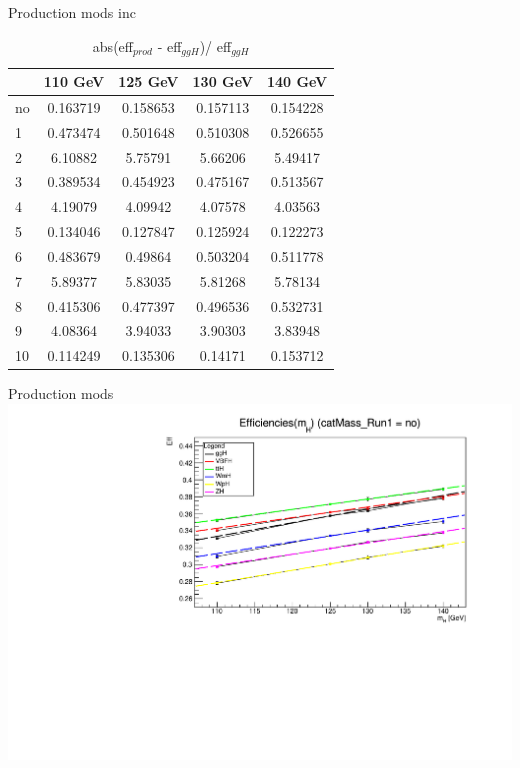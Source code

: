 \documentclass[10pt,UKenglish, leqno, xcolor = dvipsnames]{beamer}
\begin{document}
		\begin{frame}{Production mods inc}
			\vfill
			\centering
			\begin{table}[tbp]
				\centering
				\begin{tabular}{lcccc}
					\toprule[1.5pt]
								& 110 GeV	& 125 GeV	& 130 GeV	& 140 GeV	\\
					\midrule
					no & 0.163719 & 0.158653 & 0.157113 & 0.154228	\\
					1 & 0.473474 & 0.501648 & 0.510308 & 0.526655	\\
					2 & 6.10882 & 5.75791 & 5.66206 & 5.49417		\\
					3 & 0.389534 & 0.454923 & 0.475167 & 0.513567	\\
					4 & 4.19079 & 4.09942 & 4.07578 & 4.03563		\\
					5 & 0.134046 & 0.127847 & 0.125924 & 0.122273	\\
					6 & 0.483679 & 0.49864 & 0.503204 & 0.511778	\\
					7 & 5.89377 & 5.83035 & 5.81268 & 5.78134		\\
					8 & 0.415306 & 0.477397 & 0.496536 & 0.532731	\\
					9 & 4.08364 & 3.94033 & 3.90303 & 3.83948		\\
					10 & 0.114249 & 0.135306 & 0.14171 & 0.153712	\\
					
					\bottomrule[1.5pt]
				\end{tabular}
				\caption{abs(eff$_{prod}$ - eff$_{ggH}$)/ eff$_{ggH}$}
			\end{table}
			\vfill
		\end{frame}
	
		\begin{frame}{Production mods}
			\vfill
			\centering
			\includegraphics[width=.9\textwidth]{../images/week_12/Signal/eff_all_prod_cat_no.pdf}
			\vfill
		\end{frame}
		
\end{document}
